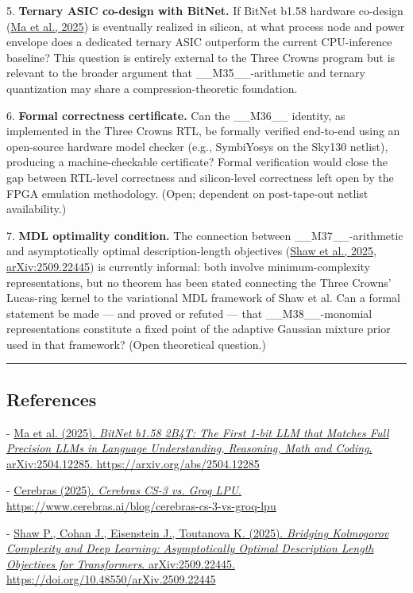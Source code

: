 5. \textbf{Ternary ASIC co-design with BitNet.} If BitNet b1.58 hardware co-design (\href{https://arxiv.org/abs/2504.12285}{Ma et al., 2025}) is eventually realized in silicon, at what process node and power envelope does a dedicated ternary ASIC outperform the current CPU-inference baseline? This question is entirely external to the Three Crowns program but is relevant to the broader argument that \_\_M35\_\_-arithmetic and ternary quantization may share a compression-theoretic foundation.

6. \textbf{Formal correctness certificate.} Can the \_\_M36\_\_ identity, as implemented in the Three Crowns RTL, be formally verified end-to-end using an open-source hardware model checker (e.g., SymbiYosys on the Sky130 netlist), producing a machine-checkable certificate? Formal verification would close the gap between RTL-level correctness and silicon-level correctness left open by the FPGA emulation methodology. (Open; dependent on post-tape-out netlist availability.)

7. \textbf{MDL optimality condition.} The connection between \_\_M37\_\_-arithmetic and asymptotically optimal description-length objectives (\href{https://arxiv.org/abs/2509.22445}{Shaw et al., 2025, arXiv:2509.22445}) is currently informal: both involve minimum-complexity representations, but no theorem has been stated connecting the Three Crowns' Lucas-ring kernel to the variational MDL framework of Shaw et al. Can a formal statement be made --- and proved or refuted --- that \_\_M38\_\_-monomial representations constitute a fixed point of the adaptive Gaussian mixture prior used in that framework? (Open theoretical question.)

\noindent\rule{\textwidth}{0.4pt}

\subsection{References}

- \href{https://arxiv.org/abs/2504.12285}{Ma et al. (2025). \textit{BitNet b1.58 2B4T: The First 1-bit LLM that Matches Full Precision LLMs in Language Understanding, Reasoning, Math and Coding}. arXiv:2504.12285. https://arxiv.org/abs/2504.12285}

- \href{https://www.cerebras.ai/blog/cerebras-cs-3-vs-groq-lpu}{Cerebras (2025). \textit{Cerebras CS-3 vs. Groq LPU}. https://www.cerebras.ai/blog/cerebras-cs-3-vs-groq-lpu}

- \href{https://arxiv.org/abs/2509.22445}{Shaw P., Cohan J., Eisenstein J., Toutanova K. (2025). \textit{Bridging Kolmogorov Complexity and Deep Learning: Asymptotically Optimal Description Length Objectives for Transformers}. arXiv:2509.22445. https://doi.org/10.48550/arXiv.2509.22445}

